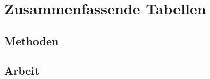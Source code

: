\documentclass[../main.tex]{subfiles} %
\begin{document}
\chapter{Zusammenfassende Tabellen}\label{ch:zusammenfassende-tabellen}

    \section{Methoden}\label{sec:methoden}

    \section{Arbeit}\label{sec:arbeit}
\end{document}
